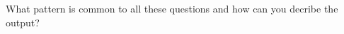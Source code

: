 \documentclass[12pt, a4paper, addpoints]{exam}
\newcommand{\gap}{\vspace{15mm}}
\newcommand{\Gap}{\vspace{38mm}}
\newcommand{\Gap}{\vspace{36mm}}
\newcommand{\unugg}{%
    \pgfmathtruncatemacro{\a}{random(2,9)} 
    \pgfmathtruncatemacro{\b}{random(2,9)} 
      \pgfmathtruncatemacro{\c}{random(2,9)} 
    \edef\result{(x - \c)(\b x +\a)}%
    \result
}
\begin{document}
\begin{questions}
\begin{multicols}{3}
\begin{parts}
           \part \( \unugg \)
    \Gap
       \part \( \unugg \)
    \Gap
       \part \( \unugg \)
    \Gap
       \part \( \unugg \)
    \Gap
       \part \( \unugg \)
    \Gap
\end{parts}
\end{multicols}
\gap
What pattern is common to all these questions and how can you decribe the output?

\end{questions}
\end{document}
